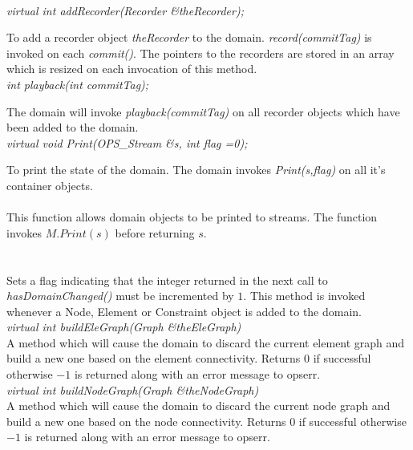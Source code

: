  \\
{\em  virtual int  addRecorder(Recorder \&theRecorder);}

To add a recorder object {\em theRecorder} to the domain. {\em
record(commitTag)} is invoked on each {\em commit()}. The pointers to
the recorders are stored in an array which is resized on each
invocation of this method.\\  

{\em int playback(int commitTag);}

The domain will invoke {\em playback(commitTag)} on all recorder
objects which have been added to the domain.\\

{\em virtual void Print(OPS_Stream \&s, int flag =0);}

To print the state of the domain. The domain invokes {\em Print(s,flag)} on
all it's container objects. \\


\\  
This function allows domain objects to be printed to streams. The
function invokes $M.Print(s)$ before returning $s$. \\

  \\
\\
Sets a flag indicating that the integer returned in the next call to 
{\em hasDomainChanged()} must be incremented by $1$. This method is
invoked whenever a Node, Element or Constraint object is added to the
domain. \\ 

{\em virtual int buildEleGraph(Graph \&theEleGraph)} \\
A method which will cause the domain to discard the current element
graph and build a new one based on the element connectivity. Returns
$0$ if successful otherwise $-1$ is returned along with an error
message to opserr. \\

{\em virtual int buildNodeGraph(Graph \&theNodeGraph)} \\
A method which will cause the domain to discard the current node
graph and build a new one based on the node connectivity. Returns
$0$ if successful otherwise $-1$ is returned along with an error
message to opserr. \\





